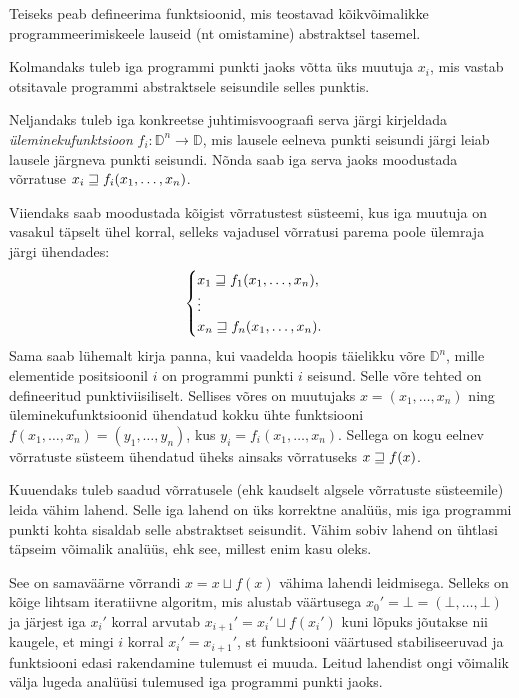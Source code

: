 \documentclass[../thesis.tex]{subfiles}
\begin{document}
Teiseks peab defineerima funktsioonid, mis teostavad kõikvõimalikke programmeerimiskeele lauseid (nt omistamine) abstraktsel tasemel.

Kolmandaks tuleb iga programmi punkti jaoks võtta üks muutuja $x_i$, mis vastab otsitavale programmi abstraktsele seisundile selles punktis.

Neljandaks tuleb iga konkreetse juhtimisvoograafi serva järgi kirjeldada \emph{üleminekufunktsioon} $f_i: \mathbb{D}^n \to \mathbb{D}$, mis lausele eelneva punkti seisundi järgi leiab lausele järgneva punkti seisundi. Nõnda saab iga serva jaoks moodustada võrratuse $x_i \sqsupseteq f_i(x_1, \ldots, x_n)$.

Viiendaks saab moodustada kõigist võrratustest süsteemi, kus iga muutuja on vasakul täpselt ühel korral, selleks vajadusel võrratusi parema poole ülemraja järgi ühendades:
\[
	\begin{cases}
		x_1 \sqsupseteq f_1(x_1, \ldots, x_n), \\
		\vdots \\
		x_n \sqsupseteq f_n(x_1, \ldots, x_n).
	\end{cases}
\]
Sama saab lühemalt kirja panna, kui vaadelda hoopis täielikku võre $\mathbb{D}^n$, mille elementide positsioonil $i$ on programmi punkti $i$ seisund. Selle võre tehted on defineeritud punktiviisiliselt. Sellises võres on muutujaks $x = (x_1, \ldots, x_n)$ ning üleminekufunktsioonid ühendatud kokku ühte funktsiooni $f(x_1, \ldots, x_n) = (y_1, \ldots, y_n)$, kus $y_i = f_i(x_1, \ldots, x_n)$. Sellega on kogu eelnev võrratuste süsteem ühendatud üheks ainsaks võrratuseks $x \sqsupseteq f(x)$.

Kuuendaks tuleb saadud võrratusele (ehk kaudselt algsele võrratuste süsteemile) leida vähim lahend. Selle iga lahend on üks korrektne analüüs, mis iga programmi punkti kohta sisaldab selle abstraktset seisundit. Vähim sobiv lahend on ühtlasi täpseim võimalik analüüs, ehk see, millest enim kasu oleks.

See on samaväärne võrrandi $x = x \sqcup f(x)$ vähima lahendi leidmisega. Selleks on kõige lihtsam iteratiivne algoritm, mis alustab väärtusega $x_0' = \bot = (\bot, \ldots, \bot)$ ja järjest iga $x_i'$ korral arvutab $x_{i+1}' = x_i' \sqcup f(x_i')$ kuni lõpuks jõutakse nii kaugele, et mingi $i$ korral $x_i' = x_{i+1}'$, st funktsiooni väärtused stabiliseeruvad ja funktsiooni edasi rakendamine tulemust ei muuda. Leitud lahendist ongi võimalik välja lugeda analüüsi tulemused iga programmi punkti jaoks.
\end{document}
